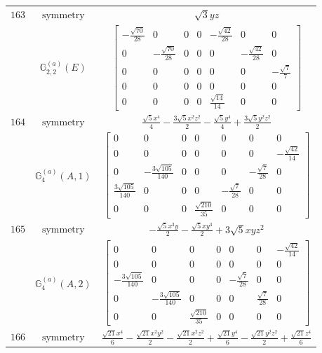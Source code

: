 \documentclass[fleqn,8pt,landscape]{jsarticle}
\begin{document}
\begin{longtable}{ccc}
$ 163 $ & $ \text{symmetry} $ & $ \sqrt{3} y z $ \\
$  $ & $ \mathbb{G}_{2,2}^{(a)}(E) $ & $ \begin{bmatrix} - \frac{\sqrt{70}}{28} & 0 & 0 & 0 & - \frac{\sqrt{42}}{28} & 0 & 0 \\ 0 & - \frac{\sqrt{70}}{28} & 0 & 0 & 0 & - \frac{\sqrt{42}}{28} & 0 \\ 0 & 0 & 0 & 0 & 0 & 0 & - \frac{\sqrt{7}}{7} \\ 0 & 0 & 0 & 0 & 0 & 0 & 0 \\ 0 & 0 & 0 & 0 & \frac{\sqrt{14}}{14} & 0 & 0 \end{bmatrix} $ \\ \hline
$ 164 $ & $ \text{symmetry} $ & $ \frac{\sqrt{5} x^{4}}{4} - \frac{3 \sqrt{5} x^{2} z^{2}}{2} - \frac{\sqrt{5} y^{4}}{4} + \frac{3 \sqrt{5} y^{2} z^{2}}{2} $ \\
$  $ & $ \mathbb{G}_{4}^{(a)}(A,1) $ & $ \begin{bmatrix} 0 & 0 & 0 & 0 & 0 & 0 & 0 \\ 0 & 0 & 0 & 0 & 0 & 0 & - \frac{\sqrt{42}}{14} \\ 0 & - \frac{3 \sqrt{105}}{140} & 0 & 0 & 0 & - \frac{\sqrt{7}}{28} & 0 \\ \frac{3 \sqrt{105}}{140} & 0 & 0 & 0 & - \frac{\sqrt{7}}{28} & 0 & 0 \\ 0 & 0 & 0 & \frac{\sqrt{210}}{35} & 0 & 0 & 0 \end{bmatrix} $ \\ \hline
$ 165 $ & $ \text{symmetry} $ & $ - \frac{\sqrt{5} x^{3} y}{2} - \frac{\sqrt{5} x y^{3}}{2} + 3 \sqrt{5} x y z^{2} $ \\
$  $ & $ \mathbb{G}_{4}^{(a)}(A,2) $ & $ \begin{bmatrix} 0 & 0 & 0 & 0 & 0 & 0 & - \frac{\sqrt{42}}{14} \\ 0 & 0 & 0 & 0 & 0 & 0 & 0 \\ - \frac{3 \sqrt{105}}{140} & 0 & 0 & 0 & - \frac{\sqrt{7}}{28} & 0 & 0 \\ 0 & - \frac{3 \sqrt{105}}{140} & 0 & 0 & 0 & \frac{\sqrt{7}}{28} & 0 \\ 0 & 0 & \frac{\sqrt{210}}{35} & 0 & 0 & 0 & 0 \end{bmatrix} $ \\ \hline
$ 166 $ & $ \text{symmetry} $ & $ \frac{\sqrt{21} x^{4}}{6} - \frac{\sqrt{21} x^{2} y^{2}}{2} - \frac{\sqrt{21} x^{2} z^{2}}{2} + \frac{\sqrt{21} y^{4}}{6} - \frac{\sqrt{21} y^{2} z^{2}}{2} + \frac{\sqrt{21} z^{4}}{6} $ \\

\end{longtable}
\end{document}
